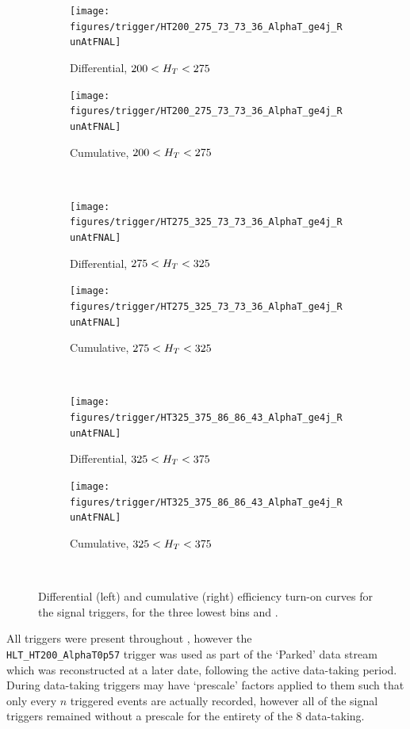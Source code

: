 \begin{figure}[p!]
  \centering
    \begin{subfigure}[b]{0.48\textwidth}
      \texttt{[image: figures/trigger/HT200\_275\_73\_73\_36\_AlphaT\_ge4j\_RunAtFNAL]}
      \caption{Differential, $200 < H_T < 275 $ \gev}
    \end{subfigure}
    \begin{subfigure}[b]{0.48\textwidth}
      \texttt{[image: figures/trigger/HT200\_275\_73\_73\_36\_AlphaT\_ge4j\_RunAtFNAL]}
      \caption{Cumulative, $200 < H_T < 275 $ \gev}
    \end{subfigure} \\
    \begin{subfigure}[b]{0.48\textwidth}
      \texttt{[image: figures/trigger/HT275\_325\_73\_73\_36\_AlphaT\_ge4j\_RunAtFNAL]}
      \caption{Differential, $275 < H_T < 325 $ \gev}
    \end{subfigure}
    \begin{subfigure}[b]{0.48\textwidth}
      \texttt{[image: figures/trigger/HT275\_325\_73\_73\_36\_AlphaT\_ge4j\_RunAtFNAL]}
      \caption{Cumulative, $275 < H_T < 325 $ \gev}
    \end{subfigure} \\
    \begin{subfigure}[b]{0.48\textwidth}
      \texttt{[image: figures/trigger/HT325\_375\_86\_86\_43\_AlphaT\_ge4j\_RunAtFNAL]}
      \caption{Differential, $325 < H_T < 375 $ \gev}
    \end{subfigure}
    \begin{subfigure}[b]{0.48\textwidth}
      \texttt{[image: figures/trigger/HT325\_375\_86\_86\_43\_AlphaT\_ge4j\_RunAtFNAL]}
      \caption{Cumulative, $325 < H_T < 375 $ \gev}
    \end{subfigure} \\
  
    \caption{\label{fig:eff_alphat_ge4j}
      Differential (left) and cumulative (right) efficiency turn-on curves for 
      the signal triggers, for the three lowest \HT bins and \njhigh.}
\end{figure}

All triggers were present throughout \runone, however the 
\\\verb!HLT_HT200_AlphaT0p57! trigger was used as part of the `Parked' data
stream which was reconstructed at a later date, following the active data-taking
period. During data-taking triggers may have `prescale' factors applied to them 
such that only every $n$ triggered events are actually recorded, however all of
the signal triggers remained without a prescale for the entirety of the 8 \tev
data-taking.


